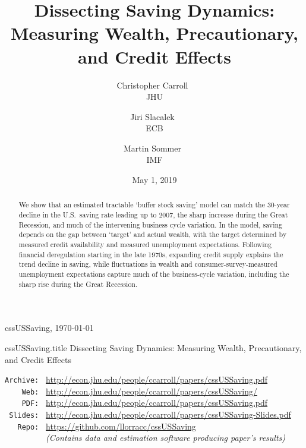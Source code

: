 \documentclass[titlepage]{\econtex}
\providecommand{\texname}{cssUSSaving}
\begin{document}

\hfill{\tiny \texname, \today}

\begin{verbatimwrite}{\texname.title}
Dissecting Saving Dynamics: Measuring Wealth, Precautionary, and Credit Effects
\end{verbatimwrite}

\title{Dissecting Saving Dynamics:  Measuring Wealth, Precautionary, and Credit Effects  }

\medskip\medskip

\author{
{Christopher Carroll\tiny{~}}\authNum \\ {\small JHU}
\and
{Jiri Slacalek\tiny{~}}\authNum \\ {\small ECB}
\and
{Martin Sommer\tiny{~}}\authNum \\ {\small IMF}
}

\date{May 1, 2019}

\maketitle




\begin{abstract}
We show that an estimated tractable `buffer stock saving' model can match the 30-year decline in the U.S.\ saving rate leading up to 2007, the sharp increase during the Great Recession, and much of the intervening business cycle variation.  In the model, saving depends on the gap between `target' and actual wealth, with the target determined by measured credit availability and measured unemployment expectations.  Following financial deregulation starting in the late 1970s, expanding credit supply explains the trend decline in saving, while fluctuations in wealth and consumer-survey-measured unemployment expectations capture much of the business-cycle variation, including the sharp rise during the Great Recession.
\end{abstract}

\parbox{\textwidth}{
\begin{center}
\begin{tabbing}
\texttt{Archive:~} \= \= \url{http://econ.jhu.edu/people/ccarroll/papers/cssUSSaving.pdf} \kill \\  
\texttt{~~~~Web:~} \> \> \url{http://econ.jhu.edu/people/ccarroll/papers/cssUSSaving/} \\
\texttt{~~~~PDF:~} \> \> \url{http://econ.jhu.edu/people/ccarroll/papers/cssUSSaving.pdf} \\
\texttt{~Slides:~} \> \> \url{http://econ.jhu.edu/people/ccarroll/papers/cssUSSaving-Slides.pdf} \\
\texttt{~~~Repo:~} \> \> \url{https://github.com/llorracc/cssUSSaving} \\
\texttt{~~~~~~~~~} \> \> {\it (Contains data and estimation software producing paper's results)}
\end{tabbing}
\end{center}
}
\end{document}
